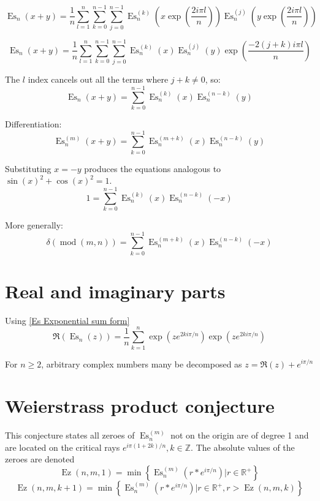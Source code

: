 \documentclass[]{article}
\DeclareMathOperator{\es}{Es}
\DeclareMathOperator{\ez}{Ez}
\DeclareMathOperator{\md}{mod}
\newcommand{\pqty}[1]{{\left(#1\right)}}
\newcommand{\Bqty}[1]{{\left\{#1\right\}}}
\begin{document}
	\begin{equation}
	\es_n\pqty{x+y}=
	\frac{1}{n}\sum _{l=1}^n \sum_{k=0}^{n-1}\sum_{j=0}^{n-1}
	\es_n^{(k)}\pqty{x\exp\pqty{\frac{2 i \pi  l}{n}}}
	\es_n^{(j)}\pqty{y\exp\pqty{\frac{2 i \pi  l}{n}}}
	\end{equation}
	
	\begin{equation}
	\es_n\pqty{x+y}=
	\frac{1}{n}\sum _{l=1}^n \sum_{k=0}^{n-1}\sum_{j=0}^{n-1}
	\es_n^{(k)}\pqty{x}
	\es_n^{(j)}\pqty{y}
	\exp\pqty{\frac{-2(j+k) i \pi  l}{n}}
	\end{equation}
	
	The \(l\) index cancels out all the terms where \(j+k\neq 0\), so:
	\begin{equation}
	\es_n\pqty{x+y}=
	\sum_{k=0}^{n-1}
	\es_n^{(k)}\pqty{x}
	\es_n^{(n-k)}\pqty{y}
	\end{equation}
	
	Differentiation:
	\begin{equation}
	\es_n^{(m)}\pqty{x+y}=
	\sum_{k=0}^{n-1}
	\es_n^{(m+k)}\pqty{x}
	\es_n^{(n-k)}\pqty{y}
	\end{equation}

	Substituting $x=-y$ produces the equations analogous to $\sin\pqty{x}^2 + \cos\pqty{x}^2=1$.
	\begin{equation}
	1=
	\sum_{k=0}^{n-1}
	\es_n^{(k)}\pqty{x}
	\es_n^{(n-k)}\pqty{-x}
	\end{equation}
	
	More generally:
	\begin{equation}
	\delta\pqty{\md\pqty{m,n}}=
	\sum_{k=0}^{n-1}
	\es_n^{(m+k)}\pqty{x}
	\es_n^{(n-k)}\pqty{-x}
	\end{equation}
	
	
	\section{Real and imaginary parts}
	Using \eqref{Es Exponential sum form}
	\begin{equation}
	\Re\pqty{\es_n\pqty{z}}=
	\frac{1}{n}\sum _{k=1}^n \exp\pqty{ze^{2ki\pi/n}}\exp\pqty{ze^{2ki\pi/n}}
	\end{equation}
	
	For $n\geq 2$, arbitrary complex numbers many be decomposed as $z=\Re\pqty{z}+e^{i\pi/n}$
	
	\section{Weierstrass product conjecture}
	This conjecture states all zeroes of $\es_n^{(m)}$ not on the origin are of degree 1 and are located on the critical rays $e^{i\pi(1+2k)/n}, k\in\mathbb{Z}$.
	The absolute values of the zeroes are denoted
	\begin{equation}
	\ez\pqty{n,m,1}=\min\Bqty{\es_n^{(m)}\pqty{r*e^{i\pi/n}}\Big\vert r\in\mathbb{R}^+}
	\end{equation}
	\begin{equation}
	\ez\pqty{n,m,k+1}=\min\Bqty{\es_n^{(m)}\pqty{r*e^{i\pi/n}}\Big\vert r\in\mathbb{R}^+, r>\ez\pqty{n,m,k}}
	\end{equation}
	
\end{document}
